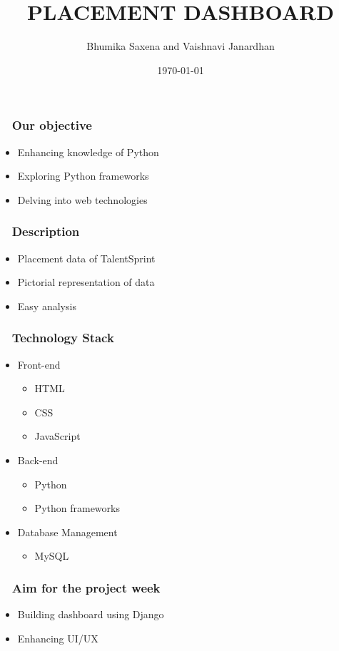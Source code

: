 \documentclass{beamer}
\title[Placement Dashboard]{PLACEMENT DASHBOARD } %
\author[Bhumika, Vaishnavi]{Bhumika Saxena and Vaishnavi Janardhan} %
\institute {TalentSprint WE}
{
\medskip
}
\date{\today} %
\begin{document}
\begin{frame}
\titlepage %
\end{frame}

\begin{frame}
\frametitle{ ~ Our objective} 
\begin{itemize}
\item{Enhancing knowledge of Python}
\item{Exploring Python frameworks}
\item{Delving into web technologies} 
\end{itemize}
\end{frame}

\begin{frame}
\frametitle{~ Description}
\begin {itemize}
\item{Placement data of TalentSprint}
\item{Pictorial representation of data}
\item{Easy analysis}
\end{itemize}
\end{frame}

\begin{frame}
\frametitle{ ~ Technology Stack} 
\begin {itemize}
\item Front-end
    \begin {itemize}
        \item{HTML} 
        \item{CSS}
        \item{JavaScript}
    \end{itemize}
\bigskip 
\item Back-end
    \begin {itemize}
        \item{Python} 
        \item{Python frameworks}
    \end{itemize}
\bigskip 
\item Database Management
    \begin {itemize}
        \item{MySQL}
    \end{itemize}
\end{itemize}
\end{frame}

\begin{frame}
\frametitle{ ~ Aim for the project week} 
\begin{itemize}
\item{Building dashboard using Django}
\item{Enhancing UI/UX}
\end{itemize}
\end{frame}
\end{document}
